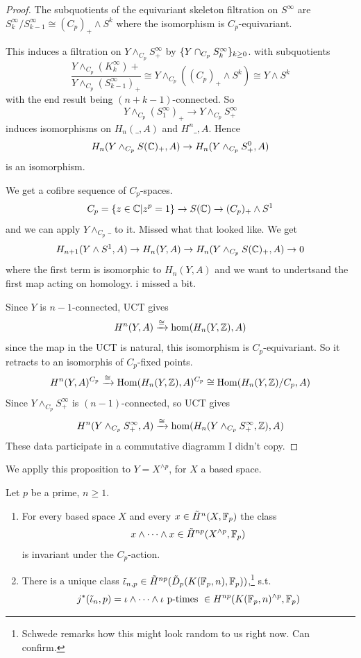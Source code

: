 \documentclass[language=english]{TemplateLecture}
\begin{document}
\begin{proof}
    The subquotients of the equivariant skeleton filtration on \(S^\infty\) are \(S^\infty_k/S^\infty_{k-1} \cong (C_p)_+ \wedge S^k\) where the isomorphism is \(C_p\)-equivariant.

    This induces a filtration on \(Y\wedge_{C_p}S^\infty_+\) by \(\{Y\cap_{C_p} S^\infty_k\}_{k\geq 0}\). with subquotients
    \[\frac{Y\wedge_{C_p}(K^\infty_k)+}{Y\wedge_{C_p}(S^\infty_{k-1})_+} \cong Y\wedge_{C_p} ((C_p)_+\wedge S^k) \cong Y\wedge S^k\]
    with the end result being \((n+k-1)\)-connected. So
    \[Y\wedge_{C_p}(S^\infty_1)_+ \to Y\wedge_{C_p}S^\infty_+\]
    induces isomorphisms on \(H_n(\_, A)\) and \(H^n\_, A\). Hence
    \[H_n(Y\wedge_{C_p} S(\mathbb{C})_+, A)\to H_n(Y\wedge_{C_p}S^0_+, A)\]
    is an isomorphism.

    We get a cofibre sequence of \(C_p\)-spaces.
    \[C_p = \{z\in \mathbb{C} | z^p = 1\} \to S(\mathbb{C}) \to (C_p)_+ \wedge S^1\]
    and we can apply \(Y\wedge_{C_p}\_\) to it. Missed what that looked like. We get
    \[H_{n+1}(Y\wedge S^1, A) \to H_n(Y,A)\to H_n(Y\wedge_{C_p}S(\mathbb{C})_+, A) \to 0\]
    where the first term is isomorphic to \(H_n(Y,A)\) and we want to undertsand the first map acting on homology. i missed a bit.

    Since \(Y\) is \(n-1\)-connected, UCT gives
    \[H^n(Y, A) \xrightarrow{\cong} \hom(H_n(Y, \mathbb{Z}), A)\]
    since the map in the UCT is natural, this isomorphism is \(C_p\)-equivariant. So it retracts to an isomorphis of \(C_p\)-fixed points.
    \[H^n(Y,A )^{C_p}\xrightarrow{\cong} \operatorname{Hom}(H_n(Y,\mathbb{Z}), A)^{C_p} \cong \operatorname{Hom}(H_n(Y,\mathbb{Z})/C_p, A)\]
    Since \(Y\wedge_{C_p}S^\infty_+\) is \((n-1)\)-connected, so UCT gives
    \[H^n(Y\wedge_{C_p}S^\infty_+, A)\xrightarrow{\cong} \hom(H_n(Y \wedge_{C_p}S^\infty_+, \mathbb{Z}), A)\]
    These data participate in a commutative diagramm I didn't copy.
\end{proof}


We applly this proposition to \(Y = X^{\wedge p}\), for \(X\) a based space.

\begin{proposition}
    Let \(p\) be a prime, \(n\geq 1\).
    \begin{enumerate}
        \item For every based space \(X\) and every \(x \in \tilde H^n(X,\mathbb{F}_p)\) the class
        \[x\wedge \dots \wedge x \in \tilde H^{np}(X^{\wedge p}, \mathbb{F}_p)\]
        is invariant under the \(C_p\)-action.
        \item There is a unique class \(\tilde\iota_{n,p} \in \tilde H^{np}(\tilde D_p(K(\mathbb{F}_p,n), \mathbb{F}_p))\),\footnote{Schwede remarks how this might look random to us right now. Can confirm.} s.t.
        \[j^*(\tilde\iota_n, p) = \iota\wedge \dots \wedge \iota \text{ p-times } \in H^{np}(K(\mathbb{F}_p,n)^{\wedge p}, \mathbb{F}_p)\]
    \end{enumerate}
\end{proposition}
\end{document}
